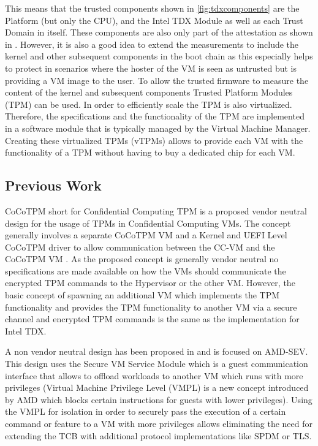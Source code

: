 \documentclass[sigplan,screen,nonacm]{acmart}
\begin{document}
This means that the trusted components shown in \cref{fig:tdxcomponents} are the Platform (but only the CPU), and the Intel TDX Module as well as each Trust Domain in itself.
These components are also only part of the attestation as shown in \cite{CA-KVM}.
However, it is also a good idea to extend the measurements to include the kernel and other subsequent components in the boot chain as this especially helps to protect in scenarios where the hoster of the VM is seen as untrusted but is providing a VM image to the user.
To allow the trusted firmware to measure the content of the kernel and subsequent components Trusted Platform Modules (TPM) can be used.
In order to efficiently scale the TPM is also virtualized.
Therefore, the specifications and the functionality of the TPM are implemented in a software module that is typically managed by the Virtual Machine Manager.
Creating these virtualized TPMs (vTPMs) allows to provide each VM with the functionality of a TPM without having to buy a dedicated chip for each VM.

\subsection{Previous Work}
CoCoTPM short for Confidential Computing TPM is a proposed vendor neutral design for the usage of TPMs in Confidential Computing VMs.
The concept generally involves a separate CoCoTPM VM and a Kernel and UEFI Level CoCoTPM driver to allow communication between the CC-VM and the CoCoTPM VM \cite[3]{10.1145/3564625.3564648}.
As the proposed concept is generally vendor neutral no specifications are made available on how the VMs should communicate the encrypted TPM commands to the Hypervisor or the other VM.
However, the basic concept of spawning an additional VM which implements the TPM functionality and provides the TPM functionality to another VM via a secure channel and encrypted TPM commands is the same as the implementation for Intel TDX.

A non vendor neutral design has been proposed in \cite{10.1145/3627106.3627112} and is focused on AMD-SEV.
This design uses the Secure VM Service Module which is a guest communication interface that allows to offload workloads to another VM which runs with more privileges (Virtual Machine Privilege Level (VMPL) is a new concept introduced by AMD which blocks certain instructions for guests with lower privileges).
Using the VMPL for isolation in order to securely pass the execution of a certain command or feature to a VM with more privileges allows eliminating the need for extending the TCB with additional protocol implementations like SPDM or TLS.
\end{document}
